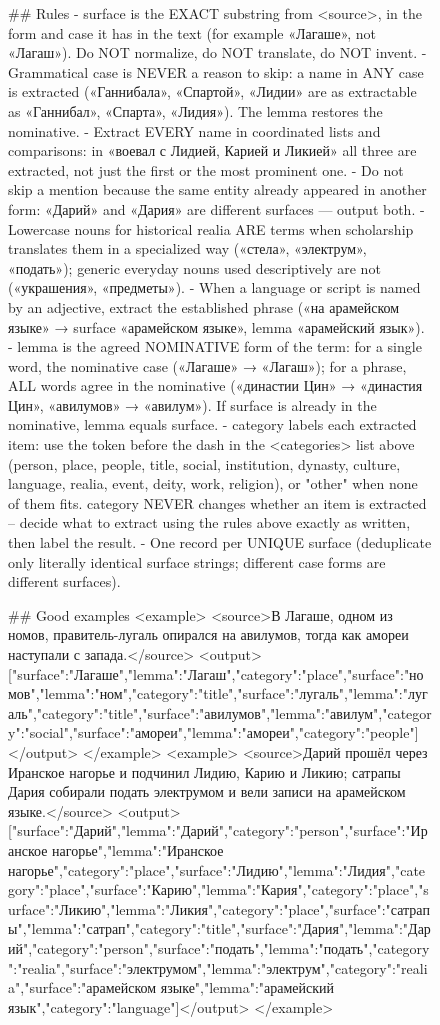 \begin{figure}[ht!]
\begin{prompt}
## Rules
- surface is the EXACT substring from <source>, in the form and case it has
  in the text (for example «Лагаше», not «Лагаш»). Do NOT normalize, do NOT
  translate, do NOT invent.
- Grammatical case is NEVER a reason to skip: a name in ANY case is
  extracted («Ганнибала», «Спартой», «Лидии» are as extractable as
  «Ганнибал», «Спарта», «Лидия»). The lemma restores the nominative.
- Extract EVERY name in coordinated lists and comparisons: in «воевал с
  Лидией, Карией и Ликией» all three are extracted, not just the first or
  the most prominent one.
- Do not skip a mention because the same entity already appeared in
  another form: «Дарий» and «Дария» are different surfaces — output both.
- Lowercase nouns for historical realia ARE terms when scholarship
  translates them in a specialized way («стела», «электрум», «подать»);
  generic everyday nouns used descriptively are not («украшения»,
  «предметы»).
- When a language or script is named by an adjective, extract the
  established phrase («на арамейском языке» → surface «арамейском языке»,
  lemma «арамейский язык»).
- lemma is the agreed NOMINATIVE form of the term: for a single word, the
  nominative case («Лагаше» → «Лагаш»); for a phrase, ALL words agree in
  the nominative («династии Цин» → «династия Цин», «авилумов» → «авилум»).
  If surface is already in the nominative, lemma equals surface.
- category labels each extracted item: use the token before the dash in the
  <categories> list above (person, place, people, title, social,
  institution, dynasty, culture, language, realia, event, deity, work,
  religion), or "other" when none of them fits. category NEVER changes
  whether an item is extracted -- decide what to extract using the rules
  above exactly as written, then label the result.
- One record per UNIQUE surface (deduplicate only literally identical
  surface strings; different case forms are different surfaces).

## Good examples
<example>
<source>В Лагаше, одном из номов, правитель-лугаль опирался на авилумов, тогда как амореи наступали с запада.</source>
<output>[{"surface":"Лагаше","lemma":"Лагаш","category":"place"},{"surface":"номов","lemma":"ном","category":"title"},{"surface":"лугаль","lemma":"лугаль","category":"title"},{"surface":"авилумов","lemma":"авилум","category":"social"},{"surface":"амореи","lemma":"амореи","category":"people"}]</output>
</example>
<example>
<source>Дарий прошёл через Иранское нагорье и подчинил Лидию, Карию и Ликию; сатрапы Дария собирали подать электрумом и вели записи на арамейском языке.</source>
<output>[{"surface":"Дарий","lemma":"Дарий","category":"person"},{"surface":"Иранское нагорье","lemma":"Иранское нагорье","category":"place"},{"surface":"Лидию","lemma":"Лидия","category":"place"},{"surface":"Карию","lemma":"Кария","category":"place"},{"surface":"Ликию","lemma":"Ликия","category":"place"},{"surface":"сатрапы","lemma":"сатрап","category":"title"},{"surface":"Дария","lemma":"Дарий","category":"person"},{"surface":"подать","lemma":"подать","category":"realia"},{"surface":"электрумом","lemma":"электрум","category":"realia"},{"surface":"арамейском языке","lemma":"арамейский язык","category":"language"}]</output>
</example>


\end{prompt}
\end{figure}
